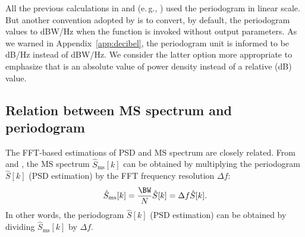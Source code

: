 

All the previous calculations in  and  (e.\,g., ) used the periodogram in linear scale. But another convention adopted by {\matlab} is to convert, by default, the periodogram values to dBW/Hz when the function  is invoked without output parameters. As we warned in Appendix~\ref{app:decibel}, the periodogram unit is informed to be dB/Hz instead of dBW/Hz. We consider
the latter option more appropriate to emphasize that is an absolute value of power density instead of a relative (dB) value.
\eExample 


\subsection{Relation between MS spectrum and periodogram}

The FFT-based estimations of PSD and MS spectrum are closely related. From  and , the MS spectrum $\hat S_{\textrm{ms}}[k]$ can be obtained by multiplying the periodogram $\hat S[k]$ (PSD estimation) by
the FFT frequency resolution $\Delta f$:
\begin{equation}
\hat S_{\textrm{ms}}[k] = \frac{\BW}{N} \hat S[k] = \Delta f \hat S[k].
\label{eq:fromPeriodogramToMS}
\end{equation}
In other words, the periodogram $\hat S[k]$ (PSD estimation) can be obtained by dividing $\hat S_{\textrm{ms}}[k]$ by $\Delta f$.

